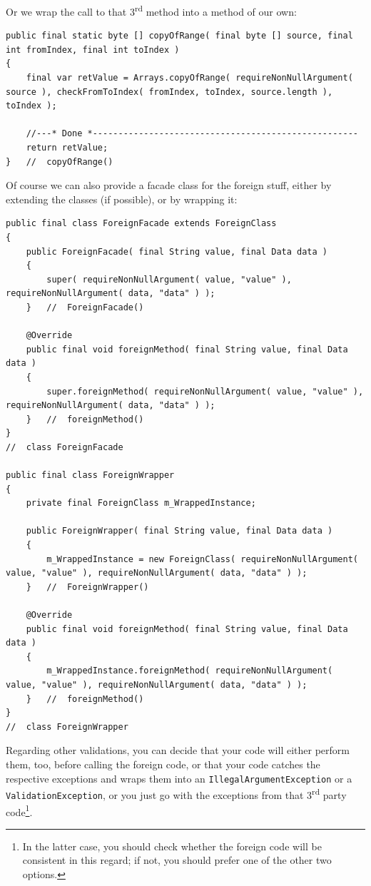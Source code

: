 Or we wrap the call to that 3\textsuperscript{rd} method into a method of our own:
\begin{lstlisting}
public final static byte [] copyOfRange( final byte [] source, final int fromIndex, final int toIndex )
{
    final var retValue = Arrays.copyOfRange( requireNonNullArgument( source ), checkFromToIndex( fromIndex, toIndex, source.length ), toIndex );
	 
    //---* Done *----------------------------------------------------
    return retValue;
}   //  copyOfRange()
\end{lstlisting}

Of course we can also provide a facade class for the foreign stuff, either by extending the classes (if possible), or by wrapping it:
\begin{lstlisting}
public final class ForeignFacade extends ForeignClass
{
    public ForeignFacade( final String value, final Data data )
    {
        super( requireNonNullArgument( value, "value" ), requireNonNullArgument( data, "data" ) );
    }   //  ForeignFacade()
    
    @Override
    public final void foreignMethod( final String value, final Data data )
    {
        super.foreignMethod( requireNonNullArgument( value, "value" ), requireNonNullArgument( data, "data" ) );
    }   //  foreignMethod()
}
//  class ForeignFacade

public final class ForeignWrapper
{
    private final ForeignClass m_WrappedInstance;
	
    public ForeignWrapper( final String value, final Data data )
    {
        m_WrappedInstance = new ForeignClass( requireNonNullArgument( value, "value" ), requireNonNullArgument( data, "data" ) );
    }   //  ForeignWrapper()
    
    @Override
    public final void foreignMethod( final String value, final Data data )
    {
        m_WrappedInstance.foreignMethod( requireNonNullArgument( value, "value" ), requireNonNullArgument( data, "data" ) );
    }   //  foreignMethod()
}
//  class ForeignWrapper
\end{lstlisting}

Regarding other validations, you can decide that your code will either perform them, too, before calling the foreign code, or that your code catches the respective exceptions and wraps them into an \lstinline|IllegalArgumentException| or a \lstinline|ValidationException|, or you just go with the exceptions from that 3\textsuperscript{rd} party code\footnote{In the latter case, you should check whether the foreign code will be consistent in this regard; if not, you should prefer one of the other two options.}.

